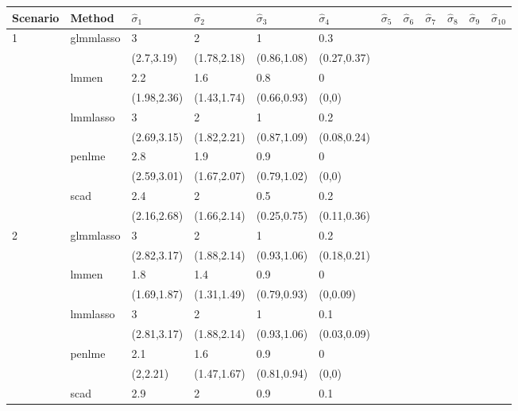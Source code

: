 \begin{table}[ht]
\centering
\begin{tabular}{llllllllllll}
  \hline
Scenario & Method & $\hat{\sigma}_{1}$ & $\hat{\sigma}_{2}$ & $\hat{\sigma}_{3}$ & $\hat{\sigma}_{4}$ & $\hat{\sigma}_{5}$ & $\hat{\sigma}_{6}$ & $\hat{\sigma}_{7}$ & $\hat{\sigma}_{8}$ & $\hat{\sigma}_{9}$ & $\hat{\sigma}_{10}$ \\ 
  \hline
\multirow{10}{*}{1} & \multirow{2}{*}{glmmlasso} & 3 & 2 & 1 & 0.3 &  &  &  &  &  &  \\ 
   &  & (2.7,3.19) & (1.78,2.18) & (0.86,1.08) & (0.27,0.37) &  &  &  &  &  &  \\ 
   & \multirow{2}{*}{lmmen} & 2.2 & 1.6 & 0.8 & 0 &  &  &  &  &  &  \\ 
   &  & (1.98,2.36) & (1.43,1.74) & (0.66,0.93) & (0,0) &  &  &  &  &  &  \\ 
   & \multirow{2}{*}{lmmlasso} & 3 & 2 & 1 & 0.2 &  &  &  &  &  &  \\ 
   &  & (2.69,3.15) & (1.82,2.21) & (0.87,1.09) & (0.08,0.24) &  &  &  &  &  &  \\ 
   & \multirow{2}{*}{penlme} & 2.8 & 1.9 & 0.9 & 0 &  &  &  &  &  &  \\ 
   &  & (2.59,3.01) & (1.67,2.07) & (0.79,1.02) & (0,0) &  &  &  &  &  &  \\ 
   & \multirow{2}{*}{scad} & 2.4 & 2 & 0.5 & 0.2 &  &  &  &  &  &  \\ 
   &  & (2.16,2.68) & (1.66,2.14) & (0.25,0.75) & (0.11,0.36) &  &  &  &  &  &  \\ 
  \multirow{10}{*}{2} & \multirow{2}{*}{glmmlasso} & 3 & 2 & 1 & 0.2 &  &  &  &  &  &  \\ 
   &  & (2.82,3.17) & (1.88,2.14) & (0.93,1.06) & (0.18,0.21) &  &  &  &  &  &  \\ 
   & \multirow{2}{*}{lmmen} & 1.8 & 1.4 & 0.9 & 0 &  &  &  &  &  &  \\ 
   &  & (1.69,1.87) & (1.31,1.49) & (0.79,0.93) & (0,0.09) &  &  &  &  &  &  \\ 
   & \multirow{2}{*}{lmmlasso} & 3 & 2 & 1 & 0.1 &  &  &  &  &  &  \\ 
   &  & (2.81,3.17) & (1.88,2.14) & (0.93,1.06) & (0.03,0.09) &  &  &  &  &  &  \\ 
   & \multirow{2}{*}{penlme} & 2.1 & 1.6 & 0.9 & 0 &  &  &  &  &  &  \\ 
   &  & (2,2.21) & (1.47,1.67) & (0.81,0.94) & (0,0) &  &  &  &  &  &  \\ 
   & \multirow{2}{*}{scad} & 2.9 & 2 & 0.9 & 0.1 &  &  &  &  &  &  \\ 

\end{tabular}
\end{table}
